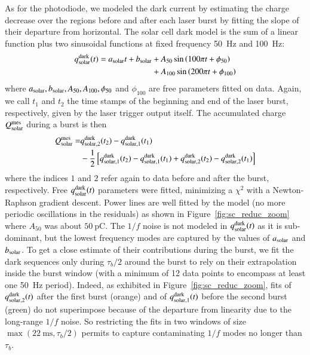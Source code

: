 As for the photodiode, we modeled the dark current by estimating the charge decrease over the regions before and after each laser burst by fitting the slope of their departure from horizontal. The solar cell dark model is the sum of a linear function plus two sinusoidal functions at fixed frequency \SI{50}{\hertz} and \SI{100}{\hertz}:
\begin{align}
    q_{\rm solar}^{\rm dark}(t) = a_{\rm solar}t + b_{\rm solar} & + A_{50} \sin \left( 100 \pi t + \phi_{50}\right)  \notag \\  & +  A_{100} \sin \left( 200 \pi t + \phi_{100}\right)
\end{align}
where $a_{\rm solar}, b_{\rm solar}, A_{50}, A_{100}, \phi_{50}$ and $\phi_{100}$ are free parameters fitted on data. 
Again, we call $t_1$ and $t_2$ the time stamps of the beginning and end of the laser burst, respectively, given by the laser trigger output itself.
The accumulated charge $Q_{\mathrm{solar}}^{\mathrm{mes}}$ during a burst is then
\begin{align}\label{eq:qsolar}
Q_{\mathrm{solar}}^{\mathrm{mes}}  = & q_{\rm solar,2}^{\rm dark}(t_2) - q_{\rm solar, 1}^{\rm dark}(t_1) \\  &  - \frac{1}{2} \left[q_{\rm solar,1}^{\rm dark}(t_2) - q_{\rm solar,1}^{\rm dark}(t_1) + q_{\rm solar,2}^{\rm dark}(t_2) - q_{\rm solar,2}^{\rm dark}(t_1)  \right]    \notag
\end{align}
where the indices $1$ and $2$ refer again to data before and after the burst, respectively.  Free $q_{\rm solar}^{\rm dark}(t)$ parameters were fitted, minimizing a $\chi^2$ with a Newton-Raphson gradient descent. Power lines are well fitted by the model (no more periodic oscillations in the residuals) as shown in Figure~\ref{fig:sc_reduc_zoom} where $A_{50}$ was about $\SI{50}{\pico\coulomb}$.
The $1/f$ noise is not modeled in $q_{\rm solar}^{\rm dark}(t)$ as it is sub-dominant, but the lowest frequency modes are captured by the values of $a_{\rm solar}$ and $b_{\rm solar}$. To get a close estimate of their contributions during the burst, we fit the dark sequences only during $\tau_b/2$ around the burst to rely on their extrapolation inside the burst window (with a minimum of 12 data points to encompass at least one \SI{50}{\hertz} period). %
Indeed, as exhibited in Figure~\ref{fig:sc_reduc_zoom}, fits of $q_{\rm solar,2}^{\rm dark}(t)$ after the first burst (orange) and of $q_{\rm solar,1}^{\rm dark}(t)$ before the second burst (green) do not superimpose because of the departure from linearity due to the long-range $1/f$ noise. So restricting the fits in two windows of size $\max(\SI{22}{\ms},\tau_b/2)$ permits to capture contaminating $1/f$ modes no longer than $\tau_b$. 

